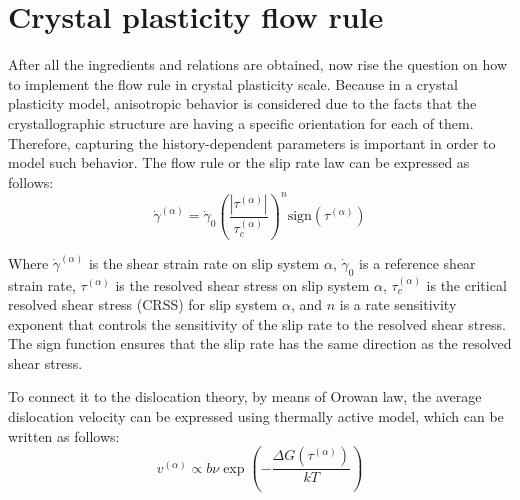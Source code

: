 \documentclass[12pt]{article}
\begin{document}
\section{Crystal plasticity flow rule}
\hspace{2em}After all the ingredients and relations are obtained, now rise the question on how to implement the flow rule in crystal plasticity
scale. Because in a crystal plasticity model, anisotropic behavior is considered due to the facts that the crystallographic structure
are having a specific orientation for each of them. Therefore, capturing the history-dependent parameters is important in order to
model such behavior. The flow rule or the slip rate law can be expressed as follows:
\begin{equation}
    \dot{\gamma}^{(\alpha)} = \dot{\gamma}_0 \left( \frac{|\tau^{(\alpha)}|}{\tau^{(\alpha)}_{c}} \right)^{n} \text{sign}(\tau^{(\alpha)})
\end{equation}

\hspace{2em}Where $\dot{\gamma}^{(\alpha)}$ is the shear strain rate on slip system $\alpha$, $\dot{\gamma}_0$ is a reference shear 
strain rate, $\tau^{(\alpha)}$ is the resolved shear stress on slip system $\alpha$, $\tau^{(\alpha)}_{c}$ is the 
critical resolved shear stress (CRSS) for slip system $\alpha$, and $n$ is a rate sensitivity exponent that controls the
sensitivity of the slip rate to the resolved shear stress. The sign function ensures that the slip rate has the same
direction as the resolved shear stress.

\hspace{2em}To connect it to the dislocation theory, by means of Orowan law, the average dislocation velocity can be expressed using
thermally active model, which can be written as follows:
\begin{equation}
     v^{(\alpha)} \propto b \nu \exp \left( -\frac{\Delta G(\tau^{(\alpha)})}{kT} \right)
\end{equation}
\end{document}
